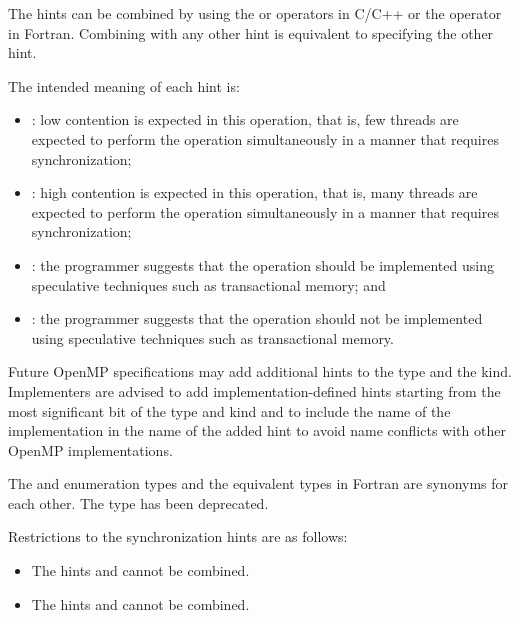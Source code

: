 The hints can be combined by using the \code{+} or \code{|} operators in C/C++ 
or the \code{+} operator in Fortran. Combining  with 
any other hint is equivalent to specifying the other hint.

The intended meaning of each hint is:

\begin{itemize}
\item {}: low contention is expected in this 
      operation, that is, few threads are expected to perform the 
      operation simultaneously in a manner that requires synchronization;
\item {}: high contention is expected in this 
      operation, that is, many threads are expected to perform the 
      operation simultaneously in a manner that requires synchronization;
\item {}: the programmer suggests that the 
      operation should be implemented using speculative techniques such 
      as transactional memory; and
\item {}: the programmer suggests that 
      the operation should not be implemented using speculative techniques 
      such as transactional memory.
\end{itemize}

\begin{note}
Future OpenMP specifications may add additional hints to the
 type and the  kind.
Implementers are advised to add implementation-defined hints starting from
the most significant bit of the  type and
 kind and to include the name of the
implementation in the name of the added hint to avoid name conflicts
with other OpenMP implementations.
\end{note}

The  and  enumeration types and 
the equivalent types in Fortran are synonyms for each other.
The type  has been deprecated.

\restrictions
Restrictions to the synchronization hints are as follows:

\begin{itemize}
\item The hints  and  
      cannot be combined.
\item The hints  and 
       cannot be combined.
\end{itemize}

